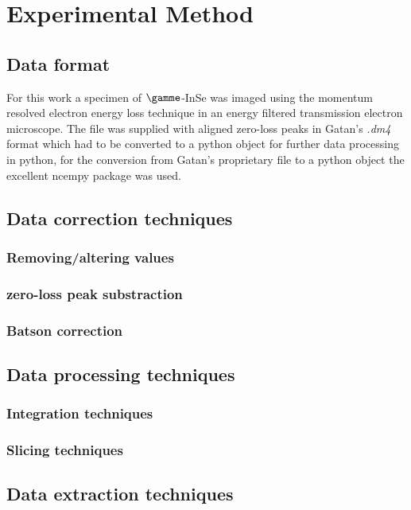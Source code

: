 \section{Experimental Method}
\subsection{Data format}
For this work a specimen of $\gamme$-InSe was imaged using the momentum resolved electron energy loss technique in an energy filtered transmission electron microscope.
The file was supplied with aligned zero-loss peaks in Gatan's \textit{.dm4} format which had to be converted to a python object for further data processing in python, for the conversion from Gatan's proprietary file to a python object the excellent ncempy package \cite{ncempy} was used.
\subsection{Data correction techniques}
\subsubsection{Removing/altering values}
\subsubsection{zero-loss peak substraction}
\subsubsection{Batson correction}
\subsection{Data processing techniques}
\subsubsection{Integration techniques}
\subsubsection{Slicing techniques}
\subsection{Data extraction techniques}

